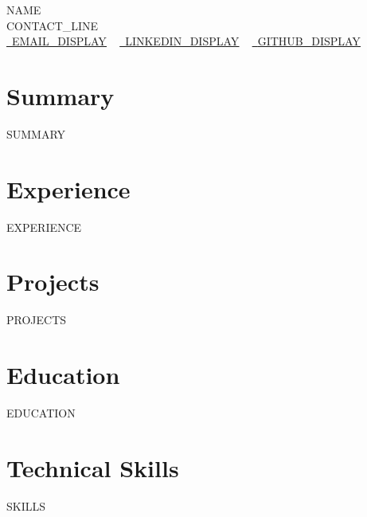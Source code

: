 \documentclass[letterpaper,11pt]{article}
\newcommand{\resumeSubHeadingListStart}{\begin{itemize}[leftmargin=0.0in, label={}]}
\newcommand{\resumeSubHeadingListEnd}{\end{itemize}}
\begin{document}
    \begin{center}
        {\Huge\scshape {{NAME}}}
        \\ {{CONTACT_LINE}}\\
        \small
        \href{mailto:{{EMAIL_URL}}}{\raisebox{-0.2\height}\faEnvelope\  \underline{{{EMAIL_DISPLAY}}}} ~
        \href{{{LINKEDIN_URL}}}{\raisebox{-0.2\height}\faLinkedin\ \underline{{{LINKEDIN_DISPLAY}}}}  ~
        \href{{{GITHUB_URL}}}{\raisebox{-0.2\height}\faGithub\ \underline{{{GITHUB_DISPLAY}}}}
    \end{center}
    \vspace{-4pt}

\section{Summary}
\small{{{SUMMARY}}}
\vspace{-4pt}

\section{Experience}
  \resumeSubHeadingListStart
{{EXPERIENCE}}
  \resumeSubHeadingListEnd

\section{Projects}
\resumeSubHeadingListStart
{{PROJECTS}}
\resumeSubHeadingListEnd

\section{Education}
  \resumeSubHeadingListStart
{{EDUCATION}}
  \resumeSubHeadingListEnd

\section{Technical Skills}
\vspace{-7pt}
\begin{itemize}
[leftmargin=0.15in, label={}]\small{\item{
{{SKILLS}}
}}
\end{itemize}
\end{document}
